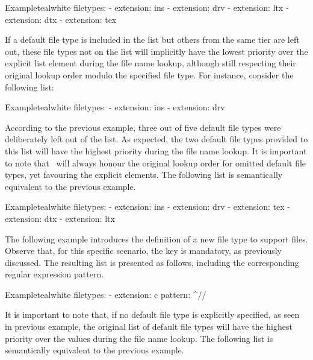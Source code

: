 \begin{description}
\begin{codebox}{Example}{teal}{\icnote}{white}
filetypes:
- extension: ins
- extension: drv
- extension: ltx
- extension: dtx
- extension: tex
\end{codebox}

If a default file type is included in the  list but others from the same tier are left out, these file types not on the list will implicitly have the lowest priority over the explicit list element during the file name lookup, although still respecting their original lookup order modulo the specified file type. For instance, consider the following list:

\begin{codebox}{Example}{teal}{\icnote}{white}
filetypes:
- extension: ins
- extension: drv
\end{codebox}

According to the previous example, three out of five default file types were deliberately left out of the  list. As expected, the two default file types provided to this list will have the highest priority during the file name lookup. It is important to note that \arara\ will always honour the original lookup order for omitted default file types, yet favouring the explicit elements. The following list is semantically equivalent to the previous example.

\begin{codebox}{Example}{teal}{\icnote}{white}
filetypes:
- extension: ins
- extension: drv
- extension: tex
- extension: dtx
- extension: ltx
\end{codebox}

The following example introduces the definition of a new file type to support  files. Observe that, for this specific scenario, the  key is mandatory, as previously discussed. The resulting list is presented as follows, including the corresponding regular expression pattern.

\begin{codebox}{Example}{teal}{\icnote}{white}
filetypes:
- extension: c
  pattern: ^\s*//\s*
\end{codebox}

It is important to note that, if no default file type is explicitly specified, as seen in previous example, the original list of default file types will have the highest priority over the  values during the file name lookup. The following list is semantically equivalent to the previous example.


\end{description}
